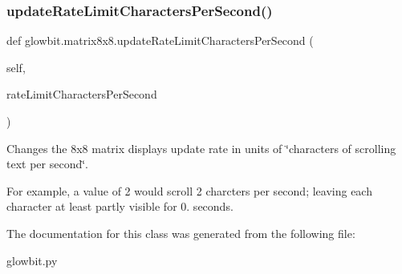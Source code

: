 \subsubsection{\texorpdfstring{update\+Rate\+Limit\+Characters\+Per\+Second()}{updateRateLimitCharactersPerSecond()}}
{\footnotesize\ttfamily def glowbit.\+matrix8x8.\+update\+Rate\+Limit\+Characters\+Per\+Second (\begin{DoxyParamCaption}\item[{}]{self,  }\item[{}]{rate\+Limit\+Characters\+Per\+Second }\end{DoxyParamCaption})}



Changes the 8x8 matrix display\textquotesingle{}s update rate in units of \char`\"{}characters of scrolling text per second\char`\"{}. 

For example, a value of 2 would scroll 2 charcters per second; leaving each character at least partly visible for 0. seconds. 

The documentation for this class was generated from the following file\+:\begin{DoxyCompactItemize}
\item 
glowbit.\+py\end{DoxyCompactItemize}
